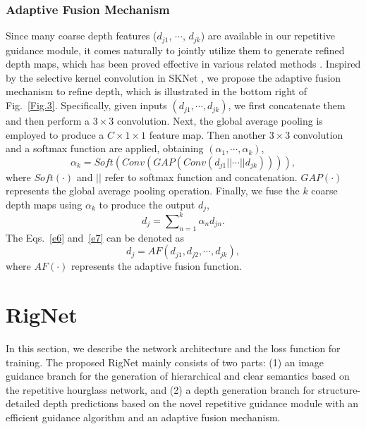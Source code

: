 \documentclass[runningheads]{llncs}
\begin{document}
\subsubsection{Adaptive Fusion Mechanism}\label{AF}
Since many coarse depth features ($d_{j1}$, $\cdots$, $d_{jk}$) are available in our repetitive guidance module, it comes naturally to jointly utilize them to generate refined depth maps, which has been proved effective in various related methods \cite{zhao2017pyramid,lin2017feature,Cheng2020CSPN,song2020channel,park2020nonlocal,hu2020PENet}. Inspired by the selective kernel convolution in SKNet \cite{li2019selective}, we propose the adaptive fusion mechanism to refine depth, which is illustrated in the bottom right of Fig.~\ref{Fig.3}. Specifically, given inputs $(d_{j1}, \cdots, d_{jk})$, we first concatenate them and then perform a $3\times 3$ convolution. Next, the global average pooling is employed to produce a $C\times 1\times 1$ feature map. Then another $3\times 3$ convolution and a softmax function are applied, obtaining $(\alpha_{1},\cdots,\alpha_{k})$,
\begin{equation}\label{e6}
{{\alpha}_{k}}=Soft\left( Conv\left( GAP\left( Conv\left( {{d}_{j1}}|| \cdots ||{{d}_{jk}} \right) \right) \right) \right),
\end{equation}
where $Soft\left( \cdot \right)$ and $||$ refer to softmax function and concatenation. $GAP\left( \cdot \right)$ represents the global average pooling operation.
Finally, we fuse the $k$ coarse depth maps using $\alpha_{k}$ to produce the output $d_j$,
\begin{equation}\label{e7}
{{d}_{j}}=\sum\nolimits_{n=1}^{k}{{{\alpha }_{n}}{{d}_{jn}}}.
\end{equation}
The Eqs.~\ref{e6} and~\ref{e7} can be denoted as
\begin{equation}\label{e8}
{{d}_{j}}=AF\left ( {d}_{j1},{d}_{j2},\cdots,{d}_{jk} \right),
\end{equation}
where $AF\left( \cdot \right)$ represents the adaptive fusion function.


\section{RigNet}
In this section, we describe the network architecture and the loss function for training. The proposed RigNet mainly consists of two parts: (1) an image guidance branch for the generation of hierarchical and clear semantics based on the repetitive hourglass network, and (2) a depth generation branch for structure-detailed depth predictions based on the novel repetitive guidance module with an efficient guidance algorithm and an adaptive fusion mechanism. 
\end{document}

